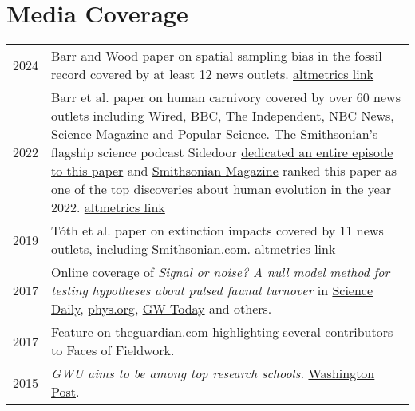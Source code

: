 \documentclass{article}
\begin{document}
\section*{Media Coverage}
\begin{longtable}{p{}p{}}
2024 & Barr and Wood paper on spatial sampling bias in the fossil record covered by at least 12 news outlets. \href{https://www.altmetric.com/details/166500154/news}{altmetrics link}\\[4pt]
2022 & Barr et al. paper on human carnivory covered by over 60 news outlets including Wired, BBC, The Independent, NBC News, Science Magazine and Popular Science. The Smithsonian's flagship science podcast Sidedoor \href{https://www.si.edu/sidedoor/did-meat-make-us-human}{dedicated an entire episode to this paper} and \href{https://www.smithsonianmag.com/smithsonian-institution/fourteen-discoveries-made-about-human-evolution-in-2022-180981344/}{Smithsonian Magazine} ranked this paper as one of the top discoveries about human evolution in the year 2022. \href{https://www.altmetric.com/details/121513529/news}{altmetrics link}\\[4pt]
2019 & Tóth et al. paper on extinction impacts covered by 11 news outlets, including Smithsonian.com. \href{https://www.altmetric.com/details/66845562/news}{altmetrics link}\\[4pt]
2017 &  Online coverage of \emph{Signal or noise? A null model method for testing hypotheses about pulsed faunal turnover} in \href{https://www.sciencedaily.com/releases/2017/08/170804100410.htm}{Science Daily}, \href{https://phys.org/news/2017-08-paper-genus-homo-response-environmental.html}{phys.org}, \href{https://gwtoday.gwu.edu/origin-human-genus-may-have-occurred-chance}{GW Today} and others. \\[4pt]
2017 & Feature on \href{https://www.theguardian.com/lifeandstyle/2017/jul/01/pregnant-in-the-field-blog-photography-have-trowel-will-travel}{theguardian.com} highlighting several contributors to Faces of Fieldwork.\\[4pt]
2015 & \emph{GWU aims to be among top research schools.} \href{http://www.washingtonpost.com/local/education/gwu-aims-to-be-among-top-research-schools/2015/03/03/491da24e-c1f1-11e4-9ec2-b418f57a4a99_gallery.html}{Washington Post}.\\
\end{longtable}
\end{document}
